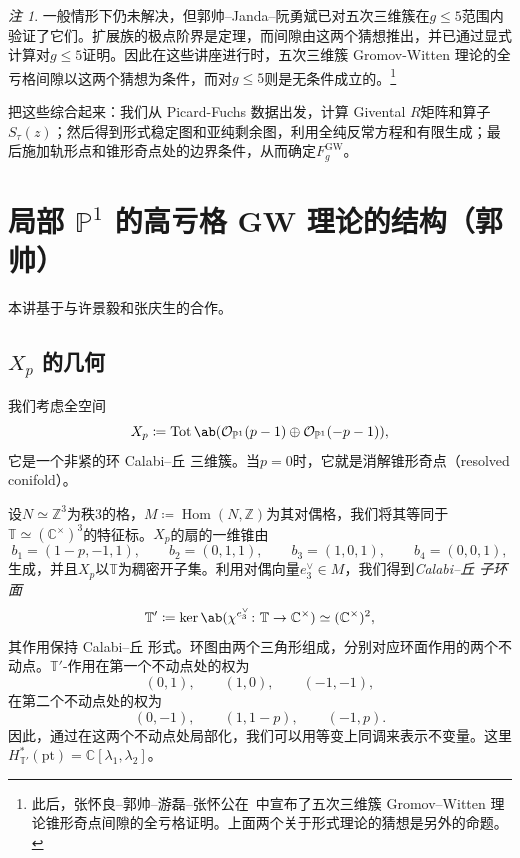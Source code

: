 \documentclass{amsart}
\theoremstyle{definition}
\theoremstyle{remark}
\newtheorem{rmk}[thm]{注}
\theoremstyle{plain}
\theoremstyle{definition}
\theoremstyle{remark}
\newcommand{\C}{\mathbb{C}}
\newcommand{\Z}{\mathbb{Z}}
\renewcommand{\P}{\mathbb{P}}
\newcommand{\mc}[1]{\mathcal{#1}}
\newcommand{\T}{\mathbb{T}}
\newcommand{\mr}[1]{\mathrm{#1}}
\newcommand{\on}[1]{\operatorname{#1}}
\newcommand{\1}{\mathbf{1}}
\newcommand{\2}{\mathbf{2}}
\newcommand{\3}{\mathbf{3}}
\DeclareMathOperator{\Hom}{Hom}
\begin{document}
\begin{rmk}
    一般情形下仍未解决，但郭帅--Janda--阮勇斌已对五次三维簇在\(g \leq 5\)范围内验证了它们。扩展族的极点阶界是定理，而间隙由这两个猜想推出，并已通过显式计算对\(g \leq 5\)证明。因此在这些讲座进行时，五次三维簇 Gromov-Witten 理论的全亏格间隙以这两个猜想为条件，而对\(g \leq 5\)则是无条件成立的。\footnote{此后，张怀良--郭帅--游磊--张怀公在~\cite{CGYZ2026}中宣布了五次三维簇 Gromov--Witten 理论锥形奇点间隙的全亏格证明。上面两个关于形式理论的猜想是另外的命题。}
\end{rmk}

把这些综合起来：我们从 Picard-Fuchs 数据出发，计算 Givental \(R\)矩阵和算子\(S_{\tau}(z)\)；然后得到形式稳定图和亚纯剩余图，利用全纯反常方程和有限生成；最后施加轨形点和锥形奇点处的边界条件，从而确定\(F_g^{\mr{GW}}\)。

\section{\texorpdfstring{局部 \(\P^1\) 的高亏格 GW 理论的结构}{局部 P1 的高亏格 GW 理论的结构}（郭帅）}%
\label{sec:Structure of higher-genus GW theory of local P1 (Shuai Guo)}

本讲基于与许景毅和张庆生的合作。

\subsection{\(X_p\) 的几何}%
\label{sub:The geometry of Xp}

我们考虑全空间
\[ X_p \coloneqq \on{Tot}\ab(\mc{O}_{\P^1}(p-1) \oplus \mc{O}_{\P^1}(-p-1)), \]
它是一个非紧的环 Calabi--丘 三维簇。当\(p = 0\)时，它就是消解锥形奇点（resolved conifold）。

设\(N \simeq \Z^3\)为秩\(3\)的格，\(M \coloneqq \Hom(N,\Z)\)为其对偶格，我们将其等同于\(\T \simeq (\C^{\times})^3\)的特征标。\(X_p\)的扇的一维锥由
\[ b_1 = (1-p,-1,1), \qquad b_2 = (0,1,1), \qquad b_3 = (1,0,1), \qquad b_4 = (0,0,1), \]
生成，并且\(X_p\)以\(\T\)为稠密开子集。利用对偶向量\(e_3^{\vee} \in M\)，我们得到\textit{Calabi--丘 子环面}
\[ \T' \coloneqq \ker\ab(\chi^{e_3^{\vee}} \colon \T \to \C^{\times}) \simeq (\C^{\times})^2, \]
其作用保持 Calabi--丘 形式。环图由两个三角形组成，分别对应环面作用的两个不动点。\(\T'\)-作用在第一个不动点处的权为
\[ (0,1), \qquad (1,0), \qquad (-1,-1), \]
在第二个不动点处的权为
\[ (0,-1), \qquad (1,1-p), \qquad (-1,p). \]
因此，通过在这两个不动点处局部化，我们可以用等变上同调来表示不变量。这里\(H^*_{\T'}(\mr{pt}) = \C[\lambda_1,\lambda_2]\)。
\end{document}
